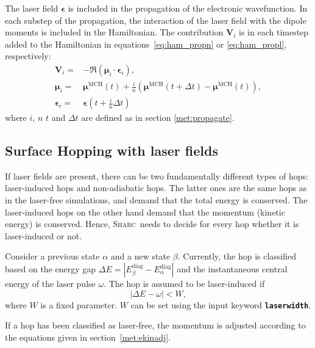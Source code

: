 \documentclass[a4paper,11pt,DIV=15,openany,twoside=false]{scrbook}
\newcommand{\sharc}{\textsc{Sharc}}
\newcommand{\ttt}[1]{\textbf{\texttt{#1}}}
\newcommand{\VEC}[1]{\ensuremath{\mathbf{#1}}}
\begin{document}
The laser field $\boldsymbol{\epsilon}$ is included in the propagation of the electronic wavefunction. In each substep of the propagation, the interaction of the laser field with the dipole moments is included in the Hamiltonian. The contribution $\VEC{V}_i$ is in each timestep added to the Hamiltonian in equations~\eqref{eq:ham_propn} or \eqref{eq:ham_propl}, respectively:
\begin{align}
  \VEC{V}_i=&
  -
  \Re\left(
    \boldsymbol{\mu}_i\cdot
    \boldsymbol{\epsilon}_i
  \right),\\
  \boldsymbol{\mu}_i=&
  \boldsymbol{\mu}^{\text{MCH}}(t) + \frac{i}{n}
  \left(
    \boldsymbol{\mu}^{\text{MCH}}(t+\Delta t)-\boldsymbol{\mu}^{\text{MCH}}(t)
  \right),\\
  \boldsymbol{\epsilon}_i=&\boldsymbol{\epsilon}\left(t+\frac{i}{n}\Delta t\right)
\end{align}
where $i$, $n$ $t$ and $\Delta t$ are defined as in section \ref{met:propagate}.

\subsection{Surface Hopping with laser fields}

If laser fields are present, there can be two fundamentally different types of hops: laser-induced hops and non-adiabatic hops. The latter ones are the same hops as in the laser-free simulations, and demand that the total energy is conserved. The laser-induced hops on the other hand demand that the momentum (kinetic energy) is conserved. Hence, \sharc\ needs to decide for every hop whether it is laser-induced or not. 

Consider a previous state $\alpha$ and a new state $\beta$. Currently, the hop is classified based on the energy gap $\Delta E=|E_\beta^\text{diag}-E_\alpha^\text{diag}|$ and the instantaneous central energy of the laser pulse $\omega$. 
The hop is assumed to be laser-induced if
\begin{equation}
  |\Delta E-\omega| < W,
\end{equation}
where $W$ is a fixed parameter. $W$ can be set using the input keyword \ttt{laserwidth}.

If a hop has been classified as laser-free, the momentum is adjusted according to the equations given in section~\ref{met:ekinadj}.
\end{document}
